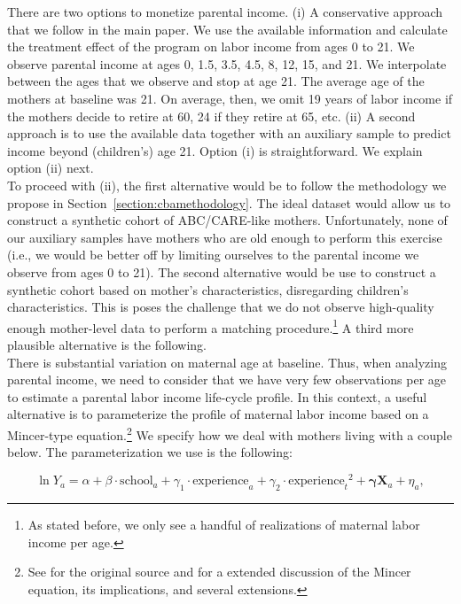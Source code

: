 \noindent There are two options to monetize parental income. (i) A conservative approach that we follow in the main paper. We use the available information and calculate the treatment effect of the program on labor income from ages 0 to 21. We observe parental income at ages 0, 1.5, 3.5, 4.5, 8, 12, 15, and 21. We interpolate between the ages that we observe and stop at age 21. The average age of the mothers at baseline was 21. On average, then, we omit 19 years of labor income if the mothers decide to retire at 60, 24 if they retire at 65, etc. (ii) A second approach is to use the available data together with an auxiliary sample to predict income beyond (children's) age 21. Option (i) is straightforward. We explain option (ii) next.\\

\noindent To proceed with (ii), the first alternative would be to follow the methodology we propose in Section~\ref{section:cbamethodology}. The ideal dataset would allow us to construct a synthetic cohort of ABC/CARE-like mothers. Unfortunately, none of our auxiliary samples have mothers who are old enough to perform this exercise (i.e., we would be better off by limiting ourselves to the parental income we observe from ages 0 to 21). The second alternative would be use to construct a synthetic cohort based on mother's characteristics, disregarding children's characteristics. This is poses the challenge that we do not observe high-quality enough mother-level data to perform a matching procedure.\footnote{As stated before, we only see a handful of realizations of maternal labor income per age.} A third more plausible alternative is the following.\\

\noindent There is substantial variation on maternal age at baseline. Thus, when analyzing parental income, we need to consider that we have very few observations per age to estimate a parental labor income life-cycle profile. In this context, a useful alternative is to parameterize the profile of maternal labor income based on a Mincer-type equation.\footnote{See \citet{Mincer_1974_schooling} for the original source and \citet{Heckman_Lochner_ea_2006_HEE} for a extended discussion of the Mincer equation, its implications, and several extensions.} We specify how we deal with mothers living with a couple below. The parameterization we use is the following:

\begin{equation}
\ln Y_{a} = \alpha + \beta \cdot \text{school}_{a} + \gamma_{1}  \cdot \text{experience}_{a} + \gamma_{2} \cdot {\text{experience}_{t}}^2 + \bm{\gamma} \mathbf{X}_{a} + \eta_{a}, \label{eq:mincer}
\end{equation}

